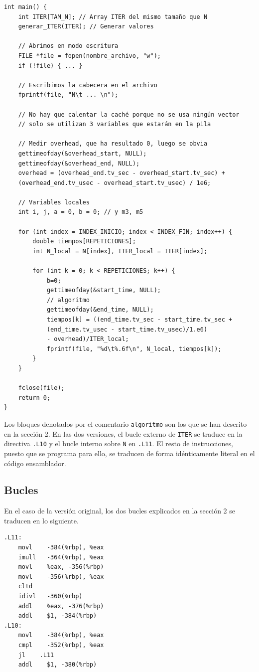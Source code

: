 \documentclass[11pt,a4paper,twoside]{article}
\theoremstyle{definition}
\begin{document}
	\begin{verbatim}
int main() {
	int ITER[TAM_N]; // Array ITER del mismo tamaño que N
	generar_ITER(ITER); // Generar valores
	
	// Abrimos en modo escritura
	FILE *file = fopen(nombre_archivo, "w"); 
	if (!file) { ... }
	
	// Escribimos la cabecera en el archivo
	fprintf(file, "N\t ... \n");
	
	// No hay que calentar la caché porque no se usa ningún vector
	// solo se utilizan 3 variables que estarán en la pila
	
	// Medir overhead, que ha resultado 0, luego se obvia
	gettimeofday(&overhead_start, NULL);
	gettimeofday(&overhead_end, NULL);
	overhead = (overhead_end.tv_sec - overhead_start.tv_sec) +
	(overhead_end.tv_usec - overhead_start.tv_usec) / 1e6;
	
	// Variables locales
	int i, j, a = 0, b = 0; // y m3, m5
	
	for (int index = INDEX_INICIO; index < INDEX_FIN; index++) {
		double tiempos[REPETICIONES];
		int N_local = N[index], ITER_local = ITER[index];
		
		for (int k = 0; k < REPETICIONES; k++) {
			b=0;
			gettimeofday(&start_time, NULL);
			// algoritmo
			gettimeofday(&end_time, NULL);
			tiempos[k] = ((end_time.tv_sec - start_time.tv_sec +
			(end_time.tv_usec - start_time.tv_usec)/1.e6)
			- overhead)/ITER_local;
			fprintf(file, "%d\t%.6f\n", N_local, tiempos[k]);
		}
	}
	
	fclose(file);
	return 0;
}
	\end{verbatim}

	Los bloques denotados por el comentario \texttt{algoritmo} son los que se han descrito en la sección 2. En las dos versiones, el bucle externo de \texttt{ITER} se traduce en la directiva \texttt{.L10} y el bucle interno sobre \texttt{N} en \texttt{.L11}. El resto de instrucciones, puesto que se programa para ello, se traducen de forma idénticamente literal en el código ensamblador.

	\subsection{Bucles}
	
	En el caso de la versión original, los dos bucles explicados en la sección 2 se traducen en lo siguiente.
	
	\begin{verbatim}
.L11:
	movl	-384(%rbp), %eax
	imull	-364(%rbp), %eax
	movl	%eax, -356(%rbp)
	movl	-356(%rbp), %eax
	cltd
	idivl	-360(%rbp)
	addl	%eax, -376(%rbp)
	addl	$1, -384(%rbp)
.L10:
	movl	-384(%rbp), %eax
	cmpl	-352(%rbp), %eax
	jl	  .L11
	addl	$1, -380(%rbp)
	\end{verbatim}
\end{document}
